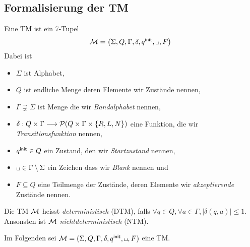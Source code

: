 \subsection{Formalisierung der \ac{TM}} %
\begin{Def}[name={[\acs*{TM}]}] %
	Eine \ac{TM} ist ein 7-Tupel
	\begin{equation*}
		\M=\left(\Sigma,Q,\Gamma,\delta,\qinit,\blank,F\right)\\
	\end{equation*}
Dabei ist
	\begin{itemize}
		\item $\Sigma$ ist Alphabet,
		\item $Q$ ist endliche Menge deren Elemente wir Zustände nennen,
		\item $\Gamma\supsetneq\Sigma$ ist Menge die wir \emph{Bandalphabet} nennen,
		\item $\delta: Q\times\Gamma\--> \Powerset(Q\times\Gamma\times\{R,L,N\})$ eine Funktion, die wir \emph{Transitionsfunktion} nennen,
		\item $q^\mathsf{init}\in Q$ ein Zustand, den wir \emph{Startzustand} nennen,
		\item $\blank\in\Gamma\setminus\Sigma$ ein Zeichen dass wir \emph{Blank} nennen und
		\item $F\subseteq Q$ eine Teilmenge der Zustände, deren Elemente wir \emph{akzeptierende} Zustände nennen.
	\end{itemize}
        Die TM $\mathcal{M}$ heisst \emph{deterministisch}
        (DTM), falls $\forall q\in Q, \forall a\in\Gamma, |\delta
        (q,a)| \le 1$.\\
        Ansonsten ist $\mathcal{M}$ \emph{nichtdeterministisch} (NTM).
\end{Def}
Im Folgenden sei $\M=(\Sigma, Q, \Gamma, \delta, \qinit, \blank, F)$ eine \ac{TM}.


